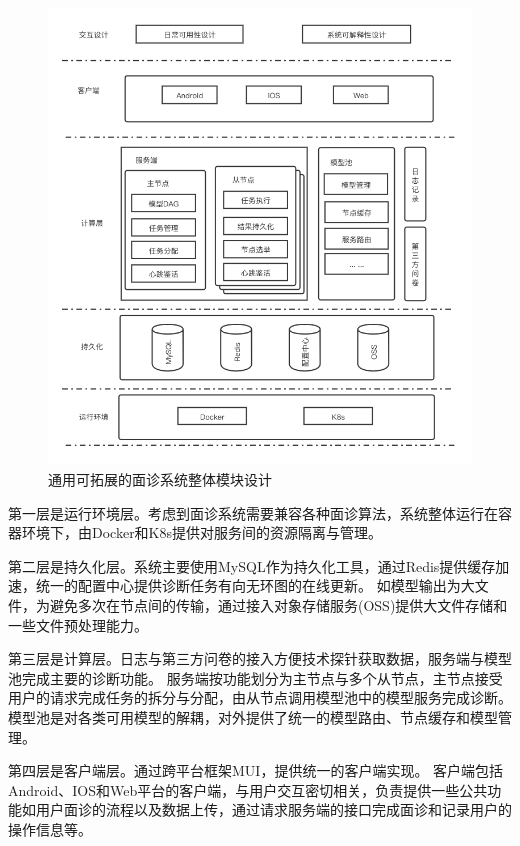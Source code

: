 \begin{figure}
    \centering
    \includegraphics[width=15cm]{images/server_5.png}
    \caption{通用可拓展的面诊系统整体模块设计}
    \label{fig:system}
\end{figure}


第一层是运行环境层。考虑到面诊系统需要兼容各种面诊算法，系统整体运行在容器环境下，由Docker和K8s提供对服务间的资源隔离与管理。

第二层是持久化层。系统主要使用MySQL作为持久化工具，通过Redis提供缓存加速，统一的配置中心提供诊断任务有向无环图的在线更新。
如模型输出为大文件，为避免多次在节点间的传输，通过接入对象存储服务(OSS)提供大文件存储和一些文件预处理能力。

第三层是计算层。日志与第三方问卷的接入方便技术探针获取数据，服务端与模型池完成主要的诊断功能。
服务端按功能划分为主节点与多个从节点，主节点接受用户的请求完成任务的拆分与分配，由从节点调用模型池中的模型服务完成诊断。
模型池是对各类可用模型的解耦，对外提供了统一的模型路由、节点缓存和模型管理。

第四层是客户端层。通过跨平台框架MUI，提供统一的客户端实现。
客户端包括Android、IOS和Web平台的客户端，与用户交互密切相关，负责提供一些公共功能如用户面诊的流程以及数据上传，通过请求服务端的接口完成面诊和记录用户的操作信息等。

